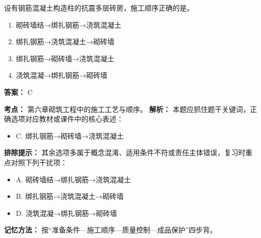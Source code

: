 \documentclass[UTF8,fontset=fandol,11pt]{ctexart}
\begin{document}
\begin{quizbox}[title={第 23 题}]
设有钢筋混凝土构造柱的抗震多层砖房，施工顺序正确的是。\\
\begin{enumerate}[label=\Alph*.]
\item 砌砖墙结→绑扎钢筋→浇筑混凝土
\item 绑扎钢筋→浇筑混凝土→砌砖墙
\item 绑扎钢筋→砌砖墙→浇筑混凝土
\item 浇筑混凝→绑扎钢筋→砌砖墙
\end{enumerate}
\textbf{答案：} C
\vspace{0.25em}
\begin{answerbox}[title={考点解析}]
\textbf{考点：} 第六章砌筑工程中的施工工艺与顺序。
\textbf{解析：} 本题应抓住题干关键词，正确选项对应教材或课件中的核心表述：
\begin{itemize}
\item C. 绑扎钢筋→砌砖墙→浇筑混凝土
\end{itemize}
\textbf{排除提示：} 其余选项多属于概念混淆、适用条件不符或责任主体错误，复习时重点对照下列干扰项：
\begin{itemize}
\item A. 砌砖墙结→绑扎钢筋→浇筑混凝土
\item B. 绑扎钢筋→浇筑混凝土→砌砖墙
\item D. 浇筑混凝→绑扎钢筋→砌砖墙
\end{itemize}
\textbf{记忆方法：} 按“准备条件—施工顺序—质量控制—成品保护”四步背。
\end{answerbox}
\end{quizbox}
\end{document}
